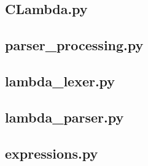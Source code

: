\documentclass{article}
\theoremstyle{definition}
\theoremstyle{remark}
\begin{document}
\subsection{CLambda.py}
\begin{small}
  
\end{small}

\subsection{parser\_processing.py}
\begin{small}
  
\end{small}

\subsection{lambda\_lexer.py}
\begin{small}
  
\end{small}

\subsection{lambda\_parser.py}
\begin{small}
  
\end{small}

\subsection{expressions.py}
\begin{small}
  
\end{small}
\end{document}
